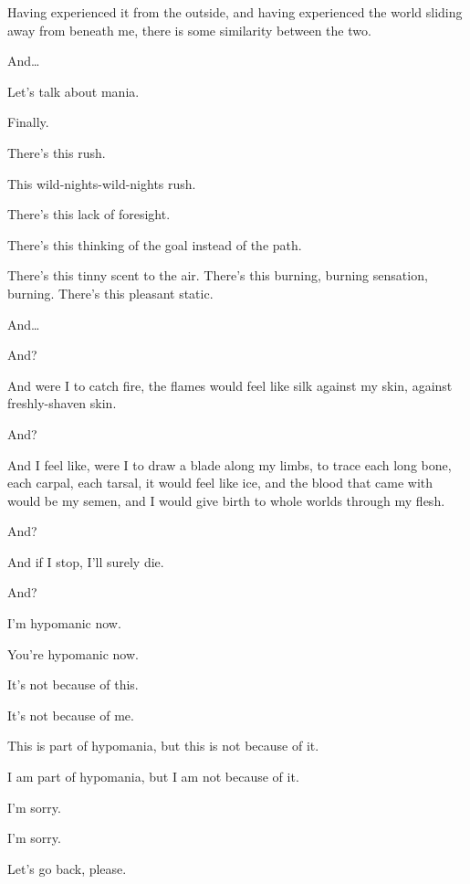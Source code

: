 Having experienced it from the outside, and having experienced the world sliding away from beneath me, there is some similarity between the two.

And\ldots{}

\newpage


\noindent Let's talk about mania.

\begin{ally}
Finally.
\end{ally}
There's this rush.

This wild-nights-wild-nights rush.

There's this lack of foresight.

There's this thinking of the goal instead of the path.

There's this tinny scent to the air. There's this burning, burning sensation, burning. There's this pleasant static.

And\ldots{}

\newpage


\begin{ally}
And?
\end{ally}
And were I to catch fire, the flames would feel like silk against my skin, against freshly-shaven skin.

\begin{ally}
And?
\end{ally}
And I feel like, were I to draw a blade along my limbs, to trace each long bone, each carpal, each tarsal, it would feel like ice, and the blood that came with would be my semen, and I would give birth to whole worlds through my flesh.

\begin{ally}
And?
\end{ally}
And if I stop, I'll surely die.

\begin{ally}
And?
\end{ally}
\newpage


\noindent I'm hypomanic now.

\begin{ally}
You're hypomanic now.
\end{ally}
It's not because of this.

\begin{ally}
It's not because of me.
\end{ally}
This is part of hypomania, but this is not because of it.

\begin{ally}
I am part of hypomania, but I am not because of it.
\end{ally}
I'm sorry.

\begin{ally}
I'm sorry.
\end{ally}
Let's go back, please.
\newpage
